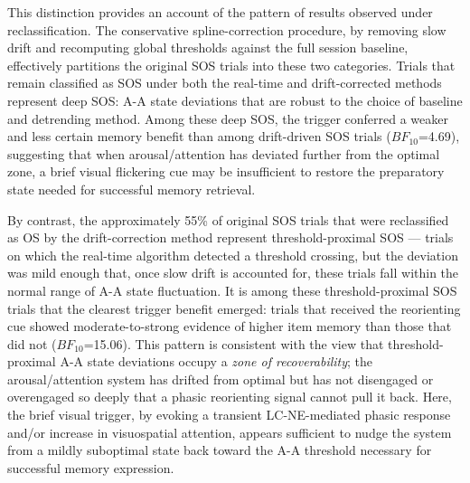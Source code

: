 This distinction provides an account of the pattern of results observed under reclassification. The conservative spline-correction procedure, by removing slow drift and recomputing global thresholds against the full session baseline, effectively partitions the original SOS trials into these two categories. Trials that remain classified as SOS under both the real-time and drift-corrected methods represent deep SOS: A-A state deviations that are robust to the choice of baseline and detrending method. Among these deep SOS, the trigger conferred a weaker and less certain memory benefit than among drift-driven SOS trials ($BF_{10}$=4.69), suggesting that when arousal/attention has deviated further from the optimal zone, a brief visual flickering cue may be insufficient to restore the preparatory state needed for successful memory retrieval.

By contrast, the approximately 55\% of original SOS trials that were reclassified as OS by the drift-correction method represent threshold-proximal SOS — trials on which the real-time algorithm detected a threshold crossing, but the deviation was mild enough that, once slow drift is accounted for, these trials fall within the normal range of A-A state fluctuation. It is among these threshold-proximal SOS trials that the clearest trigger benefit emerged: trials that received the reorienting cue showed moderate-to-strong evidence of higher item memory than those that did not ($BF_{10}$=15.06). This pattern is consistent with the view that threshold-proximal A-A state deviations occupy a \textit{zone of recoverability}; the arousal/attention system has drifted from optimal but has not disengaged or overengaged so deeply that a phasic reorienting signal cannot pull it back. Here, the brief visual trigger, by evoking a transient LC-NE-mediated phasic response and/or increase in visuospatial attention, appears sufficient to nudge the system from a mildly suboptimal state back toward the A-A threshold necessary for successful memory expression.

